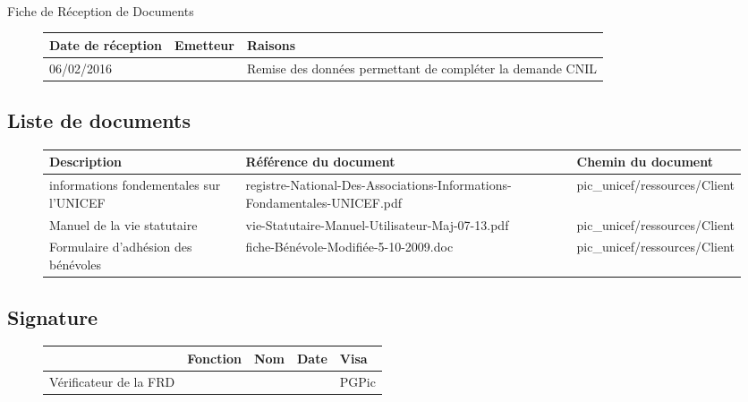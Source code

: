 \documentclass[asi, sansVersion]{picInsa}
\begin{document}
\begin{center}
\huge
\nomEquipe{}\\
Fiche de Réception de Documents\\
\end{center}
\vspace{0.5cm}


\begin{figure}[H]
		\centering
		\begin{tabularx}{17cm}{|X|X|X|}
		\hline
		\rowcolor[gray]{0.85}Date de réception & Emetteur & Raisons \\
		\hline
		06/02/2016 & \nomClient{} & Remise des données permettant de compléter la demande CNIL\\
		\hline
		\end{tabularx}
\end{figure}

\subsection*{Liste de documents}

\begin{figure}[H]
		\centering
		\begin{tabularx}{17cm}{|X|X|X|}
		\hline
		\rowcolor[gray]{0.85} Description & Référence du document & Chemin du document \\
		\hline		
		informations fondementales sur l'UNICEF & registre-National-Des-Associations-Informations-Fondamentales-UNICEF.pdf & pic\_unicef/ressources/Client \\
		\hline
		Manuel de la vie statutaire & vie-Statutaire-Manuel-Utilisateur-Maj-07-13.pdf & pic\_unicef/ressources/Client\\
		\hline
		Formulaire d'adhésion des bénévoles & fiche-Bénévole-Modifiée-5-10-2009.doc & pic\_unicef/ressources/Client\\
		\hline
		\end{tabularx}
\end{figure}

\subsection*{Signature}

\begin{figure}[H]
		\centering
		\begin{tabularx}{17cm}{|p{4cm}|X|X|X|X|}
		\hline
		\rowcolor[gray]{0.85}& Fonction & Nom & Date & Visa \\
		\hline
		 Vérificateur de la FRD & \RGC & \Mathieu &  & PGPic \\
		\hline
		\end{tabularx}
\end{figure}
\end{document}
